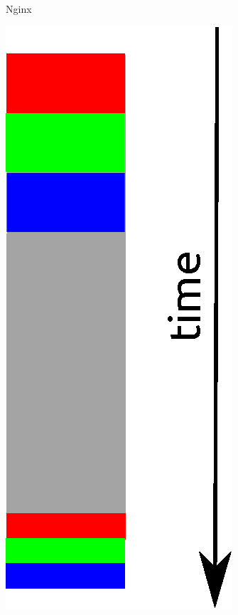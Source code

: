 \documentclass[aspectratio=169]{beamer}
\begin{document}
\begin{frame}
\begin{columns}
    \begin{column}{.45\textwidth}
      \begin{center}Nginx\end{center}
      \begin{center}
        \includegraphics[scale=0.45]{img/part1_4_concurrent.eps}
      \end{center}

    \end{column}
  \end{columns}
\end{frame}
\end{document}
